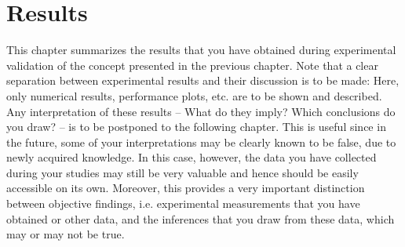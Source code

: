 \chapter{Results}
\label{chap:results}

This chapter summarizes the results that you have obtained during experimental validation of the concept presented in the previous chapter.
Note that a clear separation between experimental results and their discussion is to be made: Here, only numerical results, performance plots, etc. are to be shown and described.
Any interpretation of these results -- What do they imply? Which conclusions do you draw? -- is to be postponed to the following chapter.
This is useful since in the future, some of your interpretations may be clearly known to be false, due to newly acquired knowledge.
In this case, however, the data you have collected during your studies may still be very valuable and hence should be easily accessible on its own.
Moreover, this provides a very important distinction between objective findings, i.e. experimental measurements that you have obtained or other data, and the inferences that you draw from these data, which may or may not be true.

